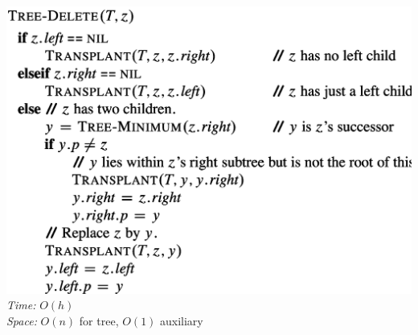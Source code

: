 {\begin{minipage}[t]{1\textwidth}
\begin{minipage}[t]{0.19\textwidth}
        \includegraphics[width=1\textwidth]{images/bst-delete.png}\\[2pt]
        \textit{Time:} \(O(h)\)\\
        \textit{Space:} \(O(n)\) for tree, \(O(1)\) auxiliary
    \end{minipage}
    
    \vspace{2pt}
\end{minipage}} 